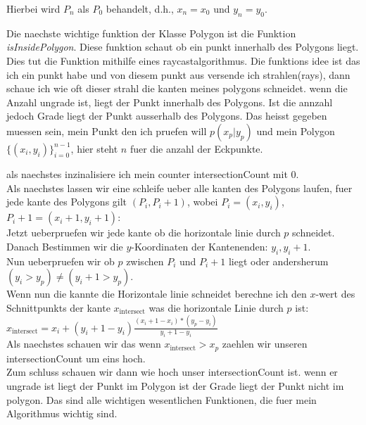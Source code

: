 \documentclass{article}
\begin{document}
\begin{center}
Hierbei wird $P_{n}$ als $P_0$ behandelt, d.h., $x_{n} = x_0$ und $y_{n} = y_0$. 
\par\medskip
Die naechste wichtige funktion der Klasse Polygon ist die Funktion \textit{isInsidePolygon}. Diese funktion schaut ob ein punkt innerhalb des Polygons liegt. Dies tut die Funktion mithilfe eines raycastalgorithmus. Die funktions idee ist das ich ein punkt habe und von diesem punkt aus versende ich strahlen(rays), dann schaue ich wie oft dieser strahl die kanten meines polygons schneidet. wenn die Anzahl ungrade ist, liegt der Punkt innerhalb des Polygons. Ist die annzahl jedoch Grade liegt der Punkt ausserhalb des Polygons. Das heisst gegeben muessen sein, mein Punkt den ich pruefen will $p(x_p|y_p)$ und mein Polygon \( \{ (x_i, y_i) \}_{i=0}^{n-1} \), hier steht $n$ fuer die anzahl der Eckpunkte.
\par\medskip
als naechstes inzinalisiere ich mein counter intersectionCount mit 0.
\\
Als naechstes lassen wir eine schleife ueber alle kanten des Polygons laufen, fuer jede kante des Polygons gilt $(P_i,P_i+1)$, wobei $P_i = (x_i,y_i)$, $P_i+1 = (x_i+1, y_i+1)$: 
\\
Jetzt ueberpruefen wir jede kante ob die horizontale linie durch $p$ schneidet.
\\
Danach Bestimmen wir die $y$-Koordinaten der Kantenenden: $y_i, y_i+1$.
\\
Nun ueberpruefen wir ob $p$ zwischen $P_i$ und $P_i+1$ liegt oder andersherum $(y_i > y_p) \neq (y_i+1 > y_p)$.
\\
Wenn nun die kannte die Horizontale linie schneidet berechne ich den $x$-wert des Schnittpunkts der kante $x_\text{intersect}$ was die horizontale Linie durch $p$ ist:
\\
$x_\text{intersect} = x_i + (y_i+1 - y_i)\frac{(x_i+1 - x_i) * (y_p - y_i)}{y_i+1 - y_i}$
\\
Als naechstes schauen wir das wenn $x_\text{intersect} > x_p$ zaehlen wir unseren intersectionCount um eins hoch.
\\
Zum schluss schauen wir dann wie hoch unser intersectionCount ist.  wenn er ungrade ist liegt der Punkt im Polygon ist der Grade liegt der Punkt nicht im polygon. Das sind alle wichtigen wesentlichen Funktionen, die fuer mein Algorithmus wichtig sind.
\end{center}
\end{document}
